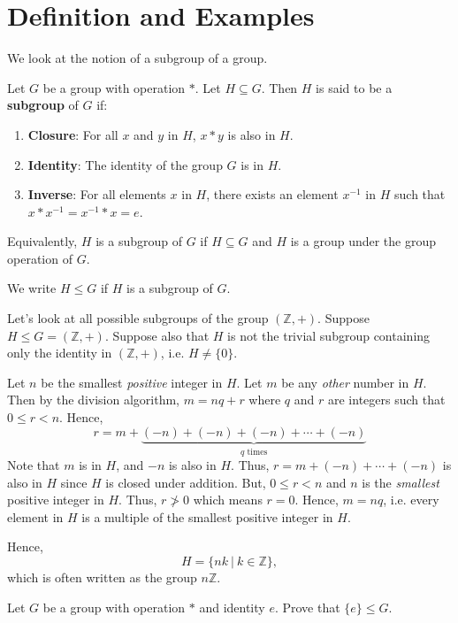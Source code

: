 \section{Definition and Examples}
We look at the notion of a subgroup of a group.
\begin{definition}
    Let $G$ be a group with operation $\ast$. Let $H \subseteq G$. Then $H$ is said to be a \textbf{subgroup} of $G$ if:
    \begin{enumerate}
        \item \textbf{Closure}: For all $x$ and $y$ in $H$, $x \ast y$ is also in $H$.
        \item \textbf{Identity}: The identity of the group $G$ is in $H$.
        \item \textbf{Inverse}: For all elements $x$ in $H$, there exists an element $x^{-1}$ in $H$ such that $x \ast x^{-1} = x^{-1} \ast x = e$.
    \end{enumerate}
\end{definition}
\begin{remark}
    Equivalently, $H$ is a subgroup of $G$ if $H \subseteq G$ and $H$ is a group under the group operation of $G$.
\end{remark}
We write $H \leq G$ if $H$ is a subgroup of $G$.

\begin{example}
    Let's look at all possible subgroups of the group $(\mathbb{Z}, +)$. Suppose $H \leq G = (\mathbb{Z}, +)$. Suppose also that $H$ is not the trivial subgroup containing only the identity in $(\mathbb{Z}, +)$, i.e. $H \neq \{0\}$.

    Let $n$ be the smallest \textit{positive} integer in $H$. Let $m$ be any \textit{other} number in $H$. Then by the division algorithm, $m = nq + r$ where $q$ and $r$ are integers such that $0 \leq r < n$. Hence,
    \[
        r = m + \underbrace{(-n) +(-n) +(-n) + \cdots + (-n)}_{q\text{ times}}
    \]
    Note that $m$ is in $H$, and $-n$ is also in $H$. Thus, $r = m + (-n) + \cdots + (-n)$ is also in $H$ since $H$ is closed under addition. But, $0 \leq r < n$ and $n$ is the \textit{smallest} positive integer in $H$. Thus, $r \not> 0$ which means $r = 0$. Hence, $m = nq$, i.e. every element in $H$ is a multiple of the smallest positive integer in $H$.

    Hence,
    \[
    H = \{nk \ | \ k \in \mathbb{Z}\},
    \]
    which is often written as the group $n\mathbb{Z}$.
\end{example}

\begin{exercise}
    Let $G$ be a group with operation $\ast$ and identity $e$. Prove that $\{e\} \leq G$.
\end{exercise}

